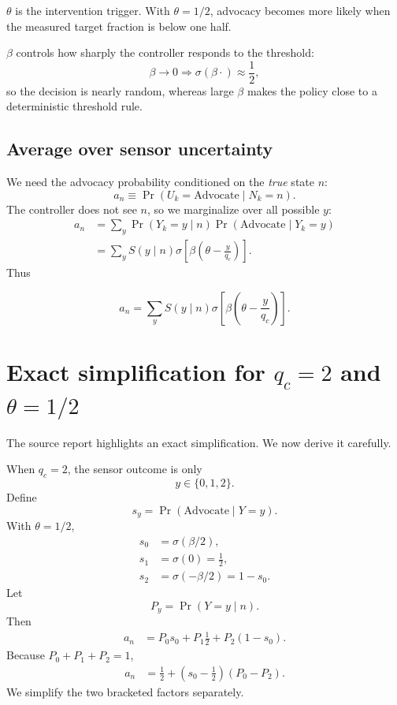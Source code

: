 \documentclass[11pt,a4paper]{article}
\newcommand{\Adv}{\ensuremath{\mathrm{Advocate}}}
\newcommand{\Prb}{\operatorname{Pr}}
\newcommand{\1}{\mathbbm{1}}
\begin{document}
$\theta$ is the intervention trigger. With $\theta=1/2$, advocacy becomes more likely when the measured target fraction is below one half.

$\beta$ controls how sharply the controller responds to the threshold:
\[
\beta\to0 \Rightarrow \sigma(\beta\cdot)\approx\frac12,
\]
so the decision is nearly random, whereas large $\beta$ makes the policy close to a deterministic threshold rule.

\subsection{Average over sensor uncertainty}

We need the advocacy probability conditioned on the \emph{true} state $n$:
\[
a_n\equiv\Prb(U_k=\Adv\mid N_k=n).
\]
The controller does not see $n$, so we marginalize over all possible $y$:
\begin{align}
a_n
&=\sum_y
\Prb(Y_k=y\mid n)
\Prb(\Adv\mid Y_k=y)\\
&=\sum_y
S(y\mid n)
\sigma\!\left[\beta\left(\theta-\frac{y}{q_c}\right)\right].
\end{align}
Thus
\begin{resultbox}
\begin{equation}
\boxed{
a_n
=
\sum_y
S(y\mid n)
\sigma\!\left[\beta\left(\theta-\frac{y}{q_c}\right)\right].}
\label{eq:an}
\end{equation}
\end{resultbox}

\section{Exact simplification for $q_c=2$ and $\theta=1/2$}

The source report highlights an exact simplification. We now derive it carefully.

When $q_c=2$, the sensor outcome is only
\[
y\in\{0,1,2\}.
\]
Define
\[
s_y=\Prb(\Adv\mid Y=y).
\]
With $\theta=1/2$,
\begin{align}
s_0&=\sigma(\beta/2),\\
s_1&=\sigma(0)=\frac12,\\
s_2&=\sigma(-\beta/2)=1-s_0.
\end{align}
Let
\[
P_y=\Prb(Y=y\mid n).
\]
Then
\begin{align}
a_n
&=P_0s_0+P_1\frac12+P_2(1-s_0).
\end{align}
Because $P_0+P_1+P_2=1$,
\begin{align}
a_n
&=\frac12+\left(s_0-\frac12\right)(P_0-P_2).
\label{eq:qc2split}
\end{align}
We simplify the two bracketed factors separately.
\end{document}
